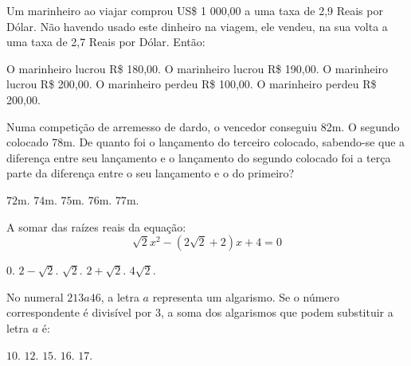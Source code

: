 \begin{question}%
Um marinheiro ao viajar comprou US\$ 1 000,00 a uma taxa de 2,9 Reais por Dólar. Não havendo usado este dinheiro na viagem, ele vendeu, na sua volta a uma taxa de 2,7 Reais por Dólar. Então:
    \begin{tasks}
        \task O marinheiro lucrou R\$ 180,00.
        \task O marinheiro lucrou R\$ 190,00.
        \task O marinheiro lucrou R\$ 200,00.
        \task O marinheiro perdeu R\$ 100,00.
        \task O marinheiro perdeu R\$ 200,00.
    \end{tasks}
\end{question}

\begin{question}%
Numa competição de arremesso de dardo, o vencedor conseguiu 82m. O segundo colocado 78m. De quanto foi o lançamento do terceiro colocado, sabendo-se que a diferença entre seu lançamento e o lançamento do segundo colocado foi a terça parte da diferença entre o seu lançamento e o do primeiro?
    \begin{tasks}
        \task \(72\)m.
        \task \(74\)m.
        \task \(75\)m.
        \task \(76\)m.
        \task \(77\)m.
    \end{tasks}
\end{question}

\begin{question}%
A somar das raízes reais da equação:
\[\sqrt{2} x^2 - (2\sqrt{2} + 2)x + 4 = 0\]
    \begin{tasks}
        \task \(0\).
        \task \(2 - \sqrt{2}\).
        \task \(\sqrt{2}\).
        \task \(2 + \sqrt{2}\).
        \task \(4\sqrt{2}\).
    \end{tasks}
\end{question}

\begin{question}%
No numeral \(213a46\), a letra \(a\) representa um algarismo. Se o número correspondente é divisível por 3, a soma dos algarismos que podem substituir a letra \(a\) é:
    \begin{tasks}
        \task \(10\).
        \task \(12\).
        \task \(15\).
        \task \(16\).
        \task \(17\).
    \end{tasks}
\end{question}
